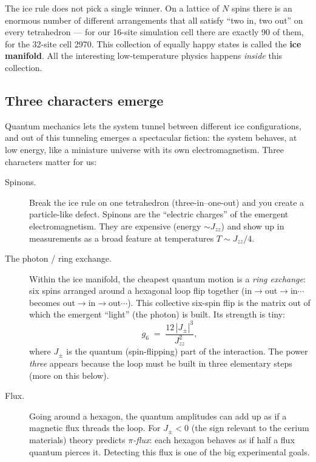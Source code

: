\documentclass[11pt,a4paper]{article}
\newcommand{\Jpm}{J_{\pm}}
\newcommand{\Jzz}{J_{zz}}
\newcommand{\gsix}{g_6}
\begin{document}
The ice rule does not pick a single winner.  On a lattice of $N$ spins there
is an enormous number of different arrangements that all satisfy ``two in,
two out'' on every tetrahedron --- for our 16-site simulation cell there are
exactly 90 of them, for the 32-site cell 2970.  This collection of equally
happy states is called the \textbf{ice manifold}.  All the interesting
low-temperature physics happens \emph{inside} this collection.

\subsection{Three characters emerge}

Quantum mechanics lets the system tunnel between different ice configurations,
and out of this tunneling emerges a spectacular fiction: the system behaves,
at low energy, like a miniature universe with its own electromagnetism.
Three characters matter for us:

\begin{description}
\item[Spinons.] Break the ice rule on one tetrahedron (three-in--one-out)
and you create a particle-like defect.  Spinons are the ``electric charges''
of the emergent electromagnetism.  They are expensive (energy $\sim\Jzz$) and
show up in measurements as a broad feature at temperatures $T\sim\Jzz/4$.

\item[The photon / ring exchange.]  Within the ice manifold, the cheapest
quantum motion is a \emph{ring exchange}: six spins arranged around a
hexagonal loop flip together (in$\to$out$\to$in$\cdots$ becomes
out$\to$in$\to$out$\cdots$).  This collective six-spin flip is the matrix
out of which the emergent ``light'' (the photon) is built.  Its strength is
tiny:
\begin{equation}
\gsix \;=\; \frac{12\,|\Jpm|^{3}}{\Jzz^{2}},
\label{eq:g6}
\end{equation}
where $\Jpm$ is the quantum (spin-flipping) part of the interaction.  The
power \emph{three} appears because the loop must be built in three elementary
steps (more on this below).

\item[Flux.]  Going around a hexagon, the quantum amplitudes can add up as if
a magnetic flux threads the loop.  For $\Jpm<0$ (the sign relevant to the
cerium materials) theory predicts \emph{$\pi$-flux}: each hexagon behaves as
if half a flux quantum pierces it.  Detecting this flux is one of the big
experimental goals.
\end{description}
\end{document}
